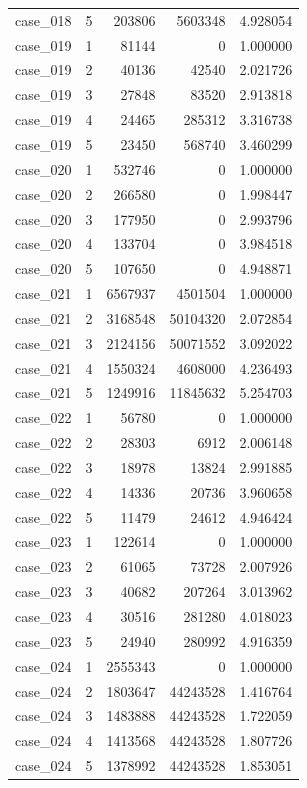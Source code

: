 \begin{longtable}{lrrrr}
case\_018 & 5 & 203806 & 5603348 & 4.928054 \\
case\_019 & 1 & 81144 & 0 & 1.000000 \\
case\_019 & 2 & 40136 & 42540 & 2.021726 \\
case\_019 & 3 & 27848 & 83520 & 2.913818 \\
case\_019 & 4 & 24465 & 285312 & 3.316738 \\
case\_019 & 5 & 23450 & 568740 & 3.460299 \\
case\_020 & 1 & 532746 & 0 & 1.000000 \\
case\_020 & 2 & 266580 & 0 & 1.998447 \\
case\_020 & 3 & 177950 & 0 & 2.993796 \\
case\_020 & 4 & 133704 & 0 & 3.984518 \\
case\_020 & 5 & 107650 & 0 & 4.948871 \\
case\_021 & 1 & 6567937 & 4501504 & 1.000000 \\
case\_021 & 2 & 3168548 & 50104320 & 2.072854 \\
case\_021 & 3 & 2124156 & 50071552 & 3.092022 \\
case\_021 & 4 & 1550324 & 4608000 & 4.236493 \\
case\_021 & 5 & 1249916 & 11845632 & 5.254703 \\
case\_022 & 1 & 56780 & 0 & 1.000000 \\
case\_022 & 2 & 28303 & 6912 & 2.006148 \\
case\_022 & 3 & 18978 & 13824 & 2.991885 \\
case\_022 & 4 & 14336 & 20736 & 3.960658 \\
case\_022 & 5 & 11479 & 24612 & 4.946424 \\
case\_023 & 1 & 122614 & 0 & 1.000000 \\
case\_023 & 2 & 61065 & 73728 & 2.007926 \\
case\_023 & 3 & 40682 & 207264 & 3.013962 \\
case\_023 & 4 & 30516 & 281280 & 4.018023 \\
case\_023 & 5 & 24940 & 280992 & 4.916359 \\
case\_024 & 1 & 2555343 & 0 & 1.000000 \\
case\_024 & 2 & 1803647 & 44243528 & 1.416764 \\
case\_024 & 3 & 1483888 & 44243528 & 1.722059 \\
case\_024 & 4 & 1413568 & 44243528 & 1.807726 \\
case\_024 & 5 & 1378992 & 44243528 & 1.853051 \\

\end{longtable}
